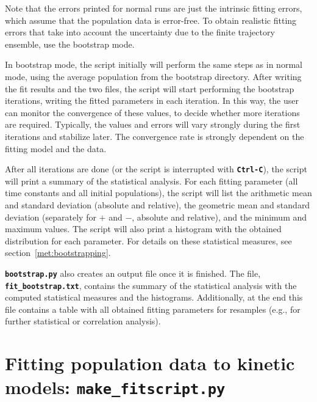 \documentclass[a4paper,10pt,DIV=15,openany]{scrbook}
\newcommand{\ttt}[1]{\textbf{\texttt{#1}}}
\begin{document}
Note that the errors printed for normal runs are just the intrinsic fitting errors, which assume that the population data is error-free.
To obtain realistic fitting errors that take into account the uncertainty due to the finite trajectory ensemble, use the bootstrap mode.

In bootstrap mode, the script initially will perform the same steps as in normal mode, using the average population from the bootstrap directory.
After writing the fit results and the two files, the script will start performing the bootstrap iterations, writing the fitted parameters in each iteration.
In this way, the user can monitor the convergence of these values, to decide whether more iterations are required.
Typically, the values and errors will vary strongly during the first iterations and stabilize later.
The convergence rate is strongly dependent on the fitting model and the data.

After all iterations are done (or the script is interrupted with \ttt{Ctrl-C}), the script will print a summary of the statistical analysis.
For each fitting parameter (all time constants and all initial populations), the script will list the arithmetic mean and standard deviation (absolute and relative), the geometric mean and standard deviation (separately for $+$ and $-$, absolute and relative), and the minimum and maximum values.
The script will also print a histogram with the obtained distribution for each parameter.
For details on these statistical measures, see section~\ref{met:bootstrapping}.

\ttt{bootstrap.py} also creates an output file  once it is finished.
The file, \ttt{fit\_bootstrap.txt}, contains the summary of the statistical analysis with the computed statistical measures and the histograms.
Additionally, at the end this file contains a table with all obtained fitting parameters for resamples (e.g., for further statistical or correlation analysis).








\section{Fitting population data to kinetic models: \ttt{make\_fitscript.py}}\label{sec:make_fitscript.py}
\end{document}
